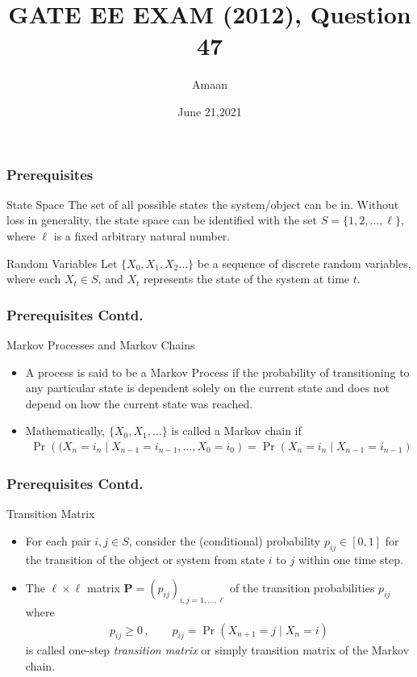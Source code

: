\documentclass{beamer}
\title{GATE EE EXAM (2012), Question 47}
\author{Amaan}
\date{June 21,2021}
\providecommand{\pr}[1]{\ensuremath{\Pr\left(#1\right)}}
\begin{document}
\begin{frame}
\titlepage
\end{frame}

\begin{frame}
    \frametitle{Prerequisites}
    \begin{block}{State Space}
      The set of all possible states the system/object can be in. Without loss in generality, the state space can be identified with the set $S=\{ 1,2,\dots,\ell\}$, where $\ell$ is a fixed arbitrary natural number.
    \end{block}
    \begin{block}{Random Variables}
     Let $\{ X_0,X_1,X_2\dots\}$ be a sequence of discrete random variables, where each $X_t \in S$, and $X_t$ represents the state of the system at time $t$.
    \end{block}
\end{frame}

\begin{frame}
    \frametitle{Prerequisites Contd.}
    \begin{block}{Markov Processes and Markov Chains}
     \begin{itemize}
    \item A process is said to be a Markov Process if the probability of transitioning to any particular state is dependent solely on the current state and does not depend on how the current state was reached.
    \item Mathematically, $ \{X_0,X_1,\ldots\}$ is called a  Markov chain if 
 \begin{align}
    \pr{(X_{n}=i_n\mid X_{n-1}=i_{n-1},\ldots,X_0=i_{0}}= \pr{X_{n}=i_n\mid X_{n-1}=i_{n-1}}
    \label{eq1}
 \end{align}
     \end{itemize}
\end{block}
\end{frame}

\begin{frame}
\frametitle{Prerequisites Contd.}
    \begin{block}{Transition Matrix}
     \begin{itemize}
        \item  For each pair $ i,j\in S$, consider the (conditional) probability $ p_{ij}\in[0,1]$ for the transition of the object or system from state $ i$ to $ j$ within one time step.
        \item The $ \ell\times\ell$ matrix $ {\mathbf{P}}=(p_{ij})_{i,j=1,\ldots,\ell}$ of the transition probabilities $ p_{ij}$ where
        \begin{align}
            p_{ij}\ge0\,,\qquad p_{ij}=\pr{X_{n+1}=j\mid X_{n}=i}	
            \label{eq2}
        \end{align}
        is called one-step \textit{transition matrix} or simply transition matrix of the Markov chain.
    \end{itemize}
    \end{block}
\end{frame}
\end{document}
